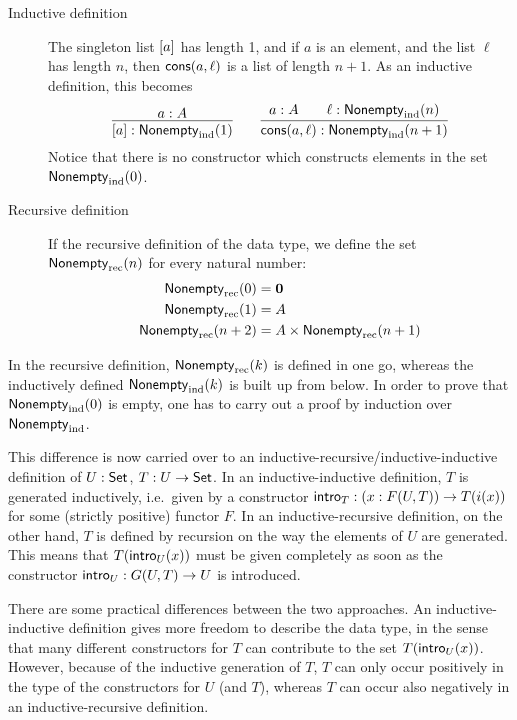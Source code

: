 \documentclass{schwicht}
\begin{document}
\begin{description}
\item[Inductive definition] The singleton list $[a]$ has length 1, and if $a$ is
  an element, and the list $\ell$ has length $n$, then
  $\mathsf{cons}(a, \ell)$ is a list of length $n + 1$. As an inductive
  definition, this becomes
\[
\infer{\singleVec{a} : \Vecind(1)}{a : A} \qquad \infer{\consVec{a}{\ell} :
  \Vecind(n + 1)}{a : A & \quad \ell : \Vecind(n)}
\]
Notice that there is no constructor which constructs elements in the
set $\mathsf{Nonempty}_{\text{ind}}(0)$.

\item[Recursive definition] If the recursive definition of the data
  type, we define the set $\mathsf{Nonempty}_{\text{rec}}(n)$ for every natural number:
  \begin{align*}
    \mathsf{Nonempty}_{\text{rec}}(0) &= \mathbf{0} \\
    \mathsf{Nonempty}_{\text{rec}}(1) &= A \\
    \mathsf{Nonempty}_{\text{rec}}(n + 2) &= A \times \mathsf{Nonempty}_{\text{rec}}(n + 1)
  \end{align*}

\end{description}

In the recursive definition, $\mathsf{Nonempty}_{\text{rec}}(k)$ is defined in one go,
whereas the inductively defined $\mathsf{Nonempty}_{\text{ind}}(k)$ is built up from
below. In order to prove that $\mathsf{Nonempty}_{\text{ind}}(0)$ is empty, one has to carry
out a proof by induction over $\mathsf{Nonempty}_{\text{ind}}$.

This difference is now carried over to an
inductive-recursive/inductive-inductive definition of $U : \mathsf{Set}$, $T :
U \to \mathsf{Set}$.
In an inductive-inductive definition, $T$ is generated
inductively, i.e.\ given by a constructor $\mathsf{intro}_{T} : (x : F(U, T))
\to T(i(x))$ for some (strictly positive) functor
$F$. %
In an inductive-recursive definition, on the other hand, $T$ is
defined by recursion on the way the elements of $U$ are
generated. This means that $T(\mathsf{intro}_{U}(x))$ must be given completely
as soon as the constructor $\mathsf{intro}_{U} : G(U, T) \to U$ is introduced.


There are some practical differences between the two approaches. An
inductive-inductive definition gives more freedom to describe the data
type, in the sense that many different constructors for $T$ can
contribute to the set $T(\mathsf{intro}_{U}(x))$.  However, because of the
inductive generation of $T$, $T$ can only occur positively in the type
of the constructors for $U$ (and $T$), whereas $T$ can occur also
negatively in an inductive-recursive definition.
\end{document}
